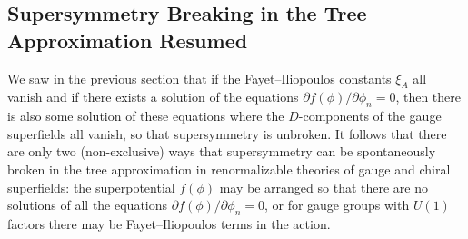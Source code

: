 
\subsection{Supersymmetry Breaking in the Tree Approximation Resumed}

We saw in the previous section that if the Fayet--Iliopoulos constants
\(\xi_A\) all vanish and if there exists a solution of the equations
\(\partial f(\phi)/\partial\phi_n=0\), then there is also some solution of
these equations where the \(D\)-components of the gauge superfields all
vanish, so that supersymmetry is unbroken. It follows that there are only two
(non-exclusive) ways that supersymmetry can be spontaneously broken in the
tree approximation in renormalizable theories of gauge and chiral
superfields: the superpotential \(f(\phi)\) may be arranged so that there are
no solutions of all the equations
\(\partial f(\phi)/\partial\phi_n=0\), or for gauge groups with \(U(1)\)
factors there may be Fayet--Iliopoulos terms in the action.


